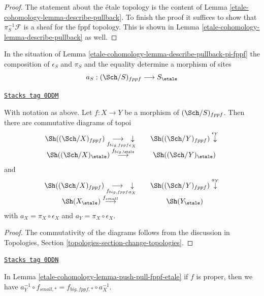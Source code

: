 \begin{proof}
The statement about the \'etale topology is the content
of Lemma \ref{etale-cohomology-lemma-describe-pullback}. To finish the proof it
suffices to show that $\pi_S^{-1}\mathcal{F}$ is a sheaf for the fppf
topology. This is shown in Lemma \ref{etale-cohomology-lemma-describe-pullback}
as well.
\end{proof}

In the situation of Lemma \ref{etale-cohomology-lemma-describe-pullback-pi-fppf}
the composition of $\epsilon_S$ and $\pi_S$ and the equality
determine a morphism of sites
$$
a_S : (\Sch/S)_{fppf} \longrightarrow S_\etale
$$

\begin{lemma}
\label{etale-cohomology-lemma-push-pull-fppf-etale}
\href{https://stacks.math.columbia.edu/tag/0DDM}{\texttt{Stacks tag 0DDM}}

With notation as above.
Let $f : X \to Y$ be a morphism of $(\Sch/S)_{fppf}$.
Then there are commutative diagrams of topoi
$$
\begin{array}{ccc}\Sh((\Sch/X)_{fppf}) \underset{f_{big, fppf}}{\longrightarrow}\underset{\epsilon_X}{\downarrow} &  & \Sh((\Sch/Y)_{fppf}) \overset{\epsilon_Y}{\downarrow} \\ \Sh((\Sch/X)_\etale) \overset{f_{big, \etale}}{\longrightarrow} &  & \Sh((\Sch/Y)_\etale)\end{array}
$$
and
$$
\begin{array}{ccc}\Sh((\Sch/X)_{fppf}) \underset{f_{big, fppf}}{\longrightarrow}\underset{a_X}{\downarrow} &  & \Sh((\Sch/Y)_{fppf}) \overset{a_Y}{\downarrow} \\ \Sh(X_\etale) \overset{f_{small}}{\longrightarrow} &  & \Sh(Y_\etale)\end{array}
$$
with $a_X = \pi_X \circ \epsilon_X$ and $a_Y = \pi_X \circ \epsilon_X$.
\end{lemma}

\begin{proof}
The commutativity of the diagrams follows from the discussion in
Topologies, Section \ref{topologies-section-change-topologies}.
\end{proof}

\begin{lemma}
\label{etale-cohomology-lemma-proper-push-pull-fppf-etale}
\href{https://stacks.math.columbia.edu/tag/0DDN}{\texttt{Stacks tag 0DDN}}

In Lemma \ref{etale-cohomology-lemma-push-pull-fppf-etale} if $f$ is proper, then we have
$a_Y^{-1} \circ f_{small, *} = f_{big, fppf, *} \circ a_X^{-1}$.
\end{lemma}


